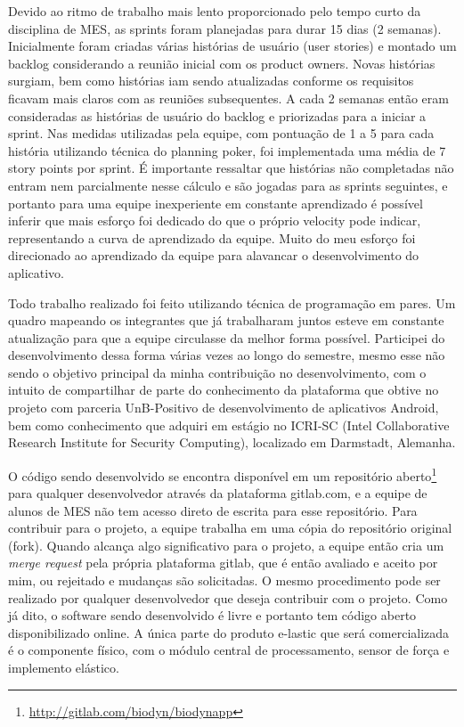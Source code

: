 Devido ao ritmo de trabalho mais lento proporcionado pelo tempo curto da disciplina de MES, as sprints foram planejadas para durar 15 dias (2 semanas). Inicialmente foram criadas várias histórias de usuário (user stories) e montado um backlog considerando a reunião inicial com os product owners. Novas histórias surgiam, bem como histórias iam sendo atualizadas conforme os requisitos ficavam mais claros com as reuniões subsequentes. A cada 2 semanas então eram consideradas as histórias de usuário do backlog e priorizadas para a iniciar a sprint. Nas medidas utilizadas pela equipe, com pontuação de 1 a 5 para cada história utilizando técnica do planning poker, foi implementada uma média de 7 story points por sprint. É importante ressaltar que histórias não completadas não entram nem parcialmente nesse cálculo e são jogadas para as sprints seguintes, e portanto para uma equipe inexperiente em constante aprendizado é possível inferir que mais esforço foi dedicado do que o próprio velocity pode indicar, representando a curva de aprendizado da equipe. Muito do meu esforço foi direcionado ao aprendizado da equipe para alavancar o desenvolvimento do aplicativo.

Todo trabalho realizado foi feito utilizando técnica de programação em pares. Um quadro mapeando os integrantes que já trabalharam juntos esteve em constante atualização para que a equipe circulasse da melhor forma possível. Participei do desenvolvimento dessa forma várias vezes ao longo do semestre, mesmo esse não sendo o objetivo principal da minha contribuição no desenvolvimento, com o intuito de compartilhar de parte do conhecimento da plataforma que obtive no projeto com parceria UnB-Positivo de desenvolvimento de aplicativos Android, bem como conhecimento que adquiri em estágio no ICRI-SC (Intel Collaborative Research Institute for Security Computing), localizado em Darmstadt, Alemanha.

O código sendo desenvolvido se encontra disponível em um repositório aberto\footnote{\url{http://gitlab.com/biodyn/biodynapp}} para qualquer desenvolvedor através da plataforma gitlab.com, e a equipe de alunos de MES não tem acesso direto de escrita para esse repositório. Para contribuir para o projeto, a equipe trabalha em uma cópia do repositório original (fork). Quando alcança algo significativo para o projeto, a equipe então cria um \textit{merge request} pela própria plataforma gitlab, que é então avaliado e aceito por mim, ou rejeitado e mudanças são solicitadas. O mesmo procedimento pode ser realizado por qualquer desenvolvedor que deseja contribuir com o projeto. Como já dito, o software sendo desenvolvido é livre e portanto tem código aberto disponibilizado online. A única parte do produto e-lastic que será comercializada é o componente físico, com o módulo central de processamento, sensor de força e implemento elástico.

